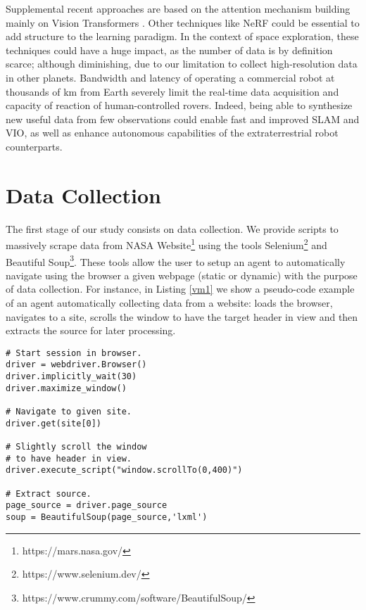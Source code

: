 \documentclass[lettersize,journal]{IEEEtran}
\begin{document}
Supplemental recent approaches \cite{Zhao2021} are based on the attention mechanism \cite{Vaswani2017} building mainly on Vision Transformers \cite{Dosovitskiy2020}. Other techniques like NeRF \cite{Mildenhall2020} could be essential to add structure to the learning paradigm. In the context of space exploration, these techniques could have a huge impact, as the number of data is by definition scarce; although diminishing, due to our limitation to collect high-resolution data in other planets. Bandwidth and latency of operating a commercial robot at thousands of km from Earth severely limit the real-time data acquisition and capacity of reaction of human-controlled rovers. Indeed, being able to synthesize new useful data from few observations could enable fast and improved SLAM and VIO, as well as enhance autonomous capabilities of the extraterrestrial robot counterparts. 

\section{Data Collection}
\label{sn:collection}

The first stage of our study consists on data collection. We provide scripts to massively scrape data from NASA Website\footnote{https://mars.nasa.gov/} 
using the tools Selenium\footnote{https://www.selenium.dev/} 
and Beautiful Soup\footnote{https://www.crummy.com/software/BeautifulSoup/}. These tools allow the user to setup an agent to automatically navigate using the browser a given webpage (static or dynamic) with the purpose of data collection. For instance, in Listing \ref{vm1} we show a pseudo-code example of an agent automatically collecting data from a website: loads the browser, navigates to a site, scrolls the window to have the target header in view and then extracts the source for later processing.\\

\begin{lstlisting}[label=vm1,caption=Example of an agent automatically collecting data from a website,float,frame=tb]
# Start session in browser.
driver = webdriver.Browser()
driver.implicitly_wait(30)
driver.maximize_window()

# Navigate to given site.
driver.get(site[0])

# Slightly scroll the window 
# to have header in view.
driver.execute_script("window.scrollTo(0,400)") 

# Extract source.
page_source = driver.page_source
soup = BeautifulSoup(page_source,'lxml')
\end{lstlisting}
\end{document}
